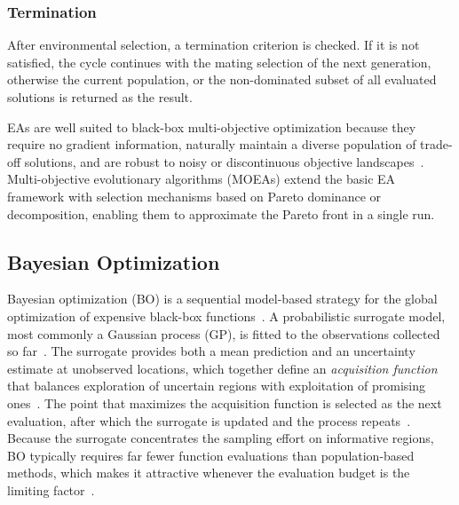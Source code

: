 \subsubsection{Termination}
After environmental selection, a termination criterion is checked. If it is not
satisfied, the cycle continues with the mating selection of the next generation, otherwise the
current population, or the non-dominated subset of all evaluated solutions is returned as the
result.
~\cite{Evolutionary_Algos}

EAs are well suited to black-box multi-objective optimization because they require no gradient information, naturally maintain a diverse population of
trade-off solutions, and are robust to noisy or discontinuous objective landscapes~\cite{Zheng2022An}. Multi-objective evolutionary algorithms (MOEAs) extend the basic
EA framework with selection mechanisms based on Pareto dominance or decomposition, enabling them to approximate the Pareto front in a single
run.~\cite{Ishibuchi2017Performance,Li2015An}

\subsection{Bayesian Optimization}
\label{subsubsec:bayesian_optimization}

Bayesian optimization (BO) is a sequential model-based strategy for the global optimization of expensive black-box functions~\cite{Lu2022Surrogate}. A probabilistic
surrogate model, most commonly a Gaussian process (GP), is fitted to the observations collected so far~\cite{Frazier2018A}. The surrogate provides both
a mean prediction and an uncertainty estimate at unobserved locations, which together define an \emph{acquisition function} that balances exploration
of uncertain regions with exploitation of promising ones~\cite{Frazier2018A,Candelieri2021A}. The point that maximizes the acquisition function is
selected as the next evaluation, after which the surrogate is updated and the process repeats~\cite{Wang2022Recent, olson2025ax}. Because the
surrogate concentrates the sampling effort on informative regions, BO typically requires far fewer function evaluations than population-based methods,
which makes it attractive whenever the evaluation budget is the limiting factor~\cite{Wang2022Recent}.

